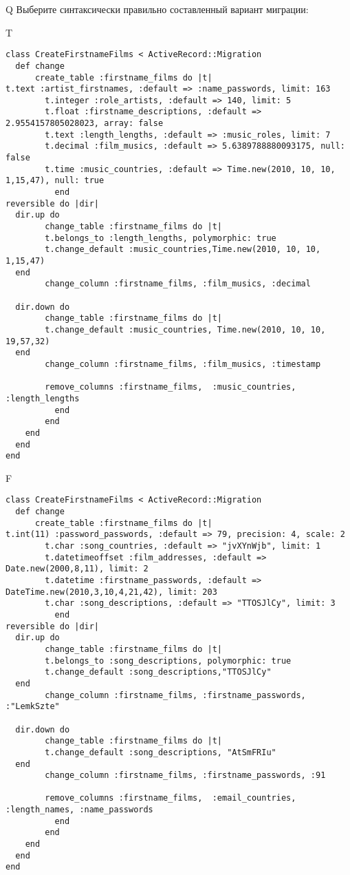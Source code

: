 Q
Выберите синтаксически правильно составленный вариант миграции:

T
\begin{verbatim}
class CreateFirstnameFilms < ActiveRecord::Migration
  def change
	  create_table :firstname_films do |t|
t.text :artist_firstnames, :default => :name_passwords, limit: 163
		t.integer :role_artists, :default => 140, limit: 5
		t.float :firstname_descriptions, :default => 2.9554157805028023, array: false
		t.text :length_lengths, :default => :music_roles, limit: 7
		t.decimal :film_musics, :default => 5.6389788880093175, null: false
		t.time :music_countries, :default => Time.new(2010, 10, 10, 1,15,47), null: true
		  end
reversible do |dir|
  dir.up do
		change_table :firstname_films do |t|
		t.belongs_to :length_lengths, polymorphic: true
 		t.change_default :music_countries,Time.new(2010, 10, 10, 1,15,47)
  end
 		change_column :firstname_films, :film_musics, :decimal
   
  dir.down do
		change_table :firstname_films do |t|
		t.change_default :music_countries, Time.new(2010, 10, 10, 19,57,32)
  end
 		change_column :firstname_films, :film_musics, :timestamp
   
		remove_columns :firstname_films,  :music_countries, :length_lengths 
	      end
	    end
    end 
  end
end

\end{verbatim}

F
\begin{verbatim}
class CreateFirstnameFilms < ActiveRecord::Migration
  def change
	  create_table :firstname_films do |t|
t.int(11) :password_passwords, :default => 79, precision: 4, scale: 2
		t.char :song_countries, :default => "jvXYnWjb", limit: 1
		t.datetimeoffset :film_addresses, :default => Date.new(2000,8,11), limit: 2
		t.datetime :firstname_passwords, :default => DateTime.new(2010,3,10,4,21,42), limit: 203
		t.char :song_descriptions, :default => "TTOSJlCy", limit: 3
		  end
reversible do |dir|
  dir.up do
		change_table :firstname_films do |t|
		t.belongs_to :song_descriptions, polymorphic: true
 		t.change_default :song_descriptions,"TTOSJlCy"
  end
 		change_column :firstname_films, :firstname_passwords, :"LemkSzte"
   
  dir.down do
		change_table :firstname_films do |t|
		t.change_default :song_descriptions, "AtSmFRIu"
  end
 		change_column :firstname_films, :firstname_passwords, :91
   
		remove_columns :firstname_films,  :email_countries, :length_names, :name_passwords 
	      end
	    end
    end 
  end
end

\end{verbatim}

